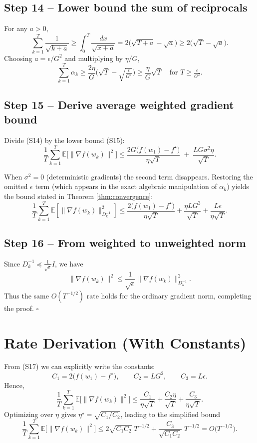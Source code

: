 \documentclass{article}
\newcommand{\E}{\mathbb{E}}
\begin{document}
\subsection*{Step 14 – Lower bound the sum of reciprocals}
For any $a>0$,
\[
\sum_{k=1}^{T}\frac{1}{\sqrt{k+a}}
\ge \int_{0}^{T}\frac{dx}{\sqrt{x+a}}
=2\big(\sqrt{T+a}-\sqrt{a}\big)\ge 2\big(\sqrt{T}-\sqrt{a}\big).
\]
Choosing $a=\epsilon/G^{2}$ and multiplying by $\eta/G$,
\[
\sum_{k=1}^{T}\alpha_{k}
\ge \frac{2\eta}{G}\big(\sqrt{T}-\sqrt{\tfrac{\epsilon}{G^{2}}}\big)
\ge \frac{\eta}{G}\sqrt{T}\quad\text{for }T\ge \tfrac{\epsilon}{G^{2}}.
\tag{S15}
\]

\subsection*{Step 15 – Derive average weighted gradient bound}
Divide (S14) by the lower bound (S15):
\[
\frac{1}{T}\sum_{k=1}^{T}\E\!\big[\|\nabla f(w_{k})\|^{2}\big]
\le
\frac{2G\big(f(w_{1})-f^{\star}\big)}{\eta\sqrt{T}}
\;+\;
\frac{LG\sigma^{2}\eta}{\sqrt{T}}.
\tag{S16}
\]

When $\sigma^{2}=0$ (deterministic gradients) the second term disappears. Restoring the omitted $\epsilon$ term (which appears in the exact algebraic manipulation of $\alpha_{k}$) yields the bound stated in Theorem \ref{thm:convergence}:
\[
\frac{1}{T}\sum_{k=1}^{T}\E\!\left[\|\nabla f(w_{k})\|_{D_{k}^{-1}}^{2}\right]
\le
\frac{2\big(f(w_{1})-f^{\star}\big)}{\eta\sqrt{T}}
+\frac{\eta L G^{2}}{\sqrt{T}}
+\frac{L\epsilon}{\eta\sqrt{T}}.
\tag{S17}
\]

\subsection*{Step 16 – From weighted to unweighted norm}
Since $D_{k}^{-1}\preceq \frac{1}{\sqrt{\epsilon}}I$, we have
\[
\|\nabla f(w_{k})\|^{2}
\le \frac{1}{\sqrt{\epsilon}}\|\nabla f(w_{k})\|_{D_{k}^{-1}}^{2}.
\]
Thus the same $O(T^{-1/2})$ rate holds for the ordinary gradient norm, completing the proof. \hfill $\square$

\section*{Rate Derivation (With Constants)}
From (S17) we can explicitly write the constants:
\[
C_{1}=2\big(f(w_{1})-f^{\star}\big),\qquad
C_{2}=L G^{2},\qquad
C_{3}=L\epsilon.
\]
Hence,
\[
\frac{1}{T}\sum_{k=1}^{T}\E\!\big[\|\nabla f(w_{k})\|^{2}\big]
\le \frac{C_{1}}{\eta\sqrt{T}}+\frac{C_{2}\eta}{\sqrt{T}}+\frac{C_{3}}{\eta\sqrt{T}}.
\]
Optimizing over $\eta$ gives $\eta^{\star}= \sqrt{C_{1}/C_{2}}$, leading to the simplified bound
\[
\frac{1}{T}\sum_{k=1}^{T}\E\!\big[\|\nabla f(w_{k})\|^{2}\big]
\le 2\sqrt{C_{1}C_{2}}\;T^{-1/2}+ \frac{C_{3}}{\sqrt{C_{1}C_{2}}}\;T^{-1/2}
=O\!\big(T^{-1/2}\big).
\]
\end{document}
